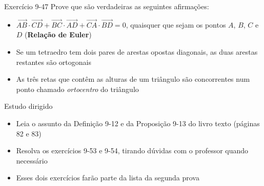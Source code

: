 \begin{frame}{Exercício 9-47}
    Prove que são verdadeiras as seguintes afirmações:
    \begin{itemize}
        \item \(\vec{AB}\cdot \vec{CD}+\vec{BC}\cdot\vec{AD}+\vec{CA}\cdot\vec{BD}=0\), quaisquer que sejam os pontos
            \(A\), \(B\), \(C\) e \(D\) (\textbf{Relação de Euler})
        \item Se um tetraedro tem dois pares de arestas opostas diagonais, as duas arestas restantes são
            ortogonais
        \item As três retas que contêm as alturas de um triângulo são concorrentes num ponto chamado \textit{ortocentro}
            do triângulo
    \end{itemize}

    \centering
\end{frame}

\begin{frame}{Estudo dirigido}
    \begin{itemize}
        \item Leia o assunto da Definição 9-12 e da Proposição 9-13 do livro texto (páginas 82 e 83)
        \item Resolva os exercícios 9-53 e 9-54, tirando dúvidas com o professor quando necessário
        \item Esses dois exercícios farão parte da lista da segunda prova
    \end{itemize}
\end{frame}
